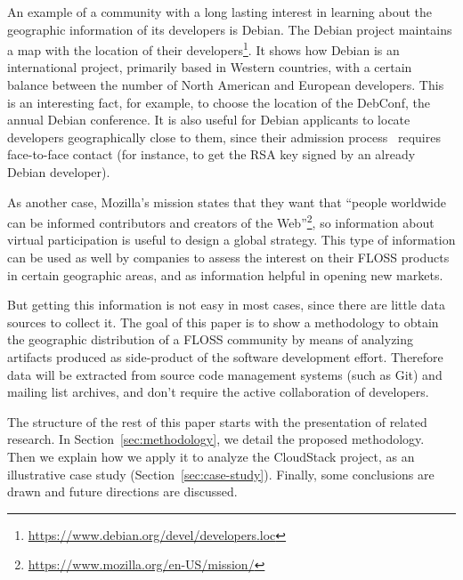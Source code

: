 \documentclass{sig-alternate-05-2015}
\begin{document}
An example of a community with a long lasting interest in learning about the geographic information of its developers is Debian. The Debian project maintains a map with the location of their developers\footnote{\url{https://www.debian.org/devel/developers.loc}}. %
It shows how Debian is an international project, primarily based in Western countries, with a certain balance between the number of North American and European developers. This is an interesting fact, for example, to choose the location of the DebConf, the annual Debian conference. It is also useful for Debian applicants to locate developers geographically close to them, since their admission process~\cite{robles2005evolution} requires face-to-face contact (for instance,
to get the RSA key signed by an already Debian developer). 


As another case, Mozilla's mission states that they want that ``people worldwide can be informed contributors and creators of the Web''\footnote{\url{https://www.mozilla.org/en-US/mission/}}, so information about virtual participation is useful to design a global strategy. This type of information can be used as well by companies to assess the interest on their FLOSS products in certain geographic areas, and as information helpful in opening new markets.

But getting this information is not easy in most cases, since there are little data sources to collect it. The goal of this paper is to show a methodology to obtain the geographic distribution of a FLOSS community by means of analyzing artifacts produced as side-product of the software development effort. Therefore data will be extracted from source code management systems (such as Git) and mailing list archives, and don't require the active collaboration of developers.

The structure of the rest of this paper starts with the presentation of related research.
In Section~\ref{sec:methodology}, we detail the proposed methodology. Then we explain how we apply it to analyze the CloudStack project, as an illustrative case study (Section~\ref{sec:case-study}). Finally, some conclusions are drawn and future directions are discussed.
\end{document}
